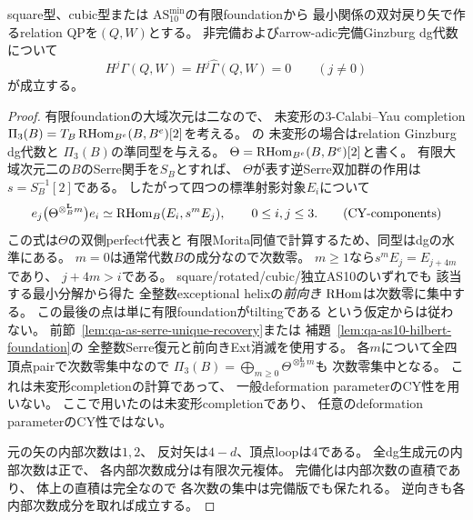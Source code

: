 \begin{lemma}
\label{lem:qa-as10-ginzburg-concentration}
square型、cubic型または
$\mathrm{AS}_{10}^{\mathrm{min}}$の有限foundationから
最小関係の双対戻り矢で作るrelation QPを$(Q,W)$とする。
非完備およびarrow-adic完備Ginzburg dg代数について
\[
 H^j\Gamma(Q,W)=H^j\widehat\Gamma(Q,W)=0
 \qquad(j\ne0)
\]
が成立する。
\end{lemma}
\begin{proof}
有限foundationの大域次元は二なので、
未変形の3-Calabi--Yau completion
$\Pi_3(B)=T_B\operatorname{RHom}_{B^e}(B,B^e)[2]$を考える。
\cite[Theorem 6.10]{KellerDeformedCY2011}の
未変形の場合はrelation Ginzburg dg代数と
$\Pi_3(B)$の準同型を与える。
$\Theta=\operatorname{RHom}_{B^e}(B,B^e)[2]$と書く。
有限大域次元二の$B$のSerre関手を$S_B$とすれば、
$\Theta$が表す逆Serre双加群の作用は
$s=S_B^{-1}[2]$である。
したがって四つの標準射影対象$E_i$について
\[
 e_j\bigl(\Theta^{\otimes_B^{\mathbf L}m}\bigr)e_i
  \simeq\operatorname{RHom}_B(E_i,s^m E_j),\qquad
 0\le i,j\le3 .
 \tag{CY-components}\label{eq:qa-as10-cy-tensor-components}
\]
この式は$\Theta$の双側perfect代表と
有限Morita同値で計算するため、同型はdgの水準にある。
$m=0$は通常代数$B$の成分なので次数零。
$m\ge1$なら$s^mE_j=E_{j+4m}$であり、
$j+4m>i$である。
square/rotated/cubic/独立AS10のいずれでも
該当する最小分解から得た
全整数exceptional helixの\emph{前向き}
$\operatorname{RHom}$は次数零に集中する。
この最後の点は単に有限foundationがtiltingである
という仮定からは従わない。
前節~\ref{lem:qa-as-serre-unique-recovery}または
補題~\ref{lem:qa-as10-hilbert-foundation}の
全整数Serre復元と前向きExt消滅を使用する。
各$m$について全四頂点pairで次数零集中なので
$\Pi_3(B)=\bigoplus_{m\ge0}
 \Theta^{\otimes_B^{\mathbf L}m}$も
次数零集中となる。
これは未変形completionの計算であって、
一般deformation parameterのCY性を用いない。
ここで用いたのは未変形completionであり、
任意のdeformation parameterのCY性ではない。

元の矢の内部次数は$1,2$、
反対矢は$4-d$、頂点loopは$4$である。
全dg生成元の内部次数は正で、
各内部次数成分は有限次元複体。
完備化は内部次数の直積であり、
体上の直積は完全なので
各次数の集中は完備版でも保たれる。
逆向きも各内部次数成分を取れば成立する。
\end{proof}

